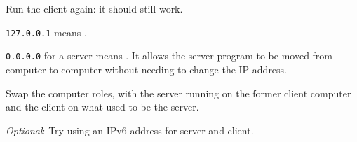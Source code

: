 Run the client again: it should still work.

\begin{IMPORTANT}
\texttt{127.0.0.1} means .

\texttt{0.0.0.0} for a server means . It allows
the server program to be moved from computer to computer without needing to change the
IP address.
\end{IMPORTANT}

\STEP Swap the computer roles, with the server running on the former client computer and
the client on what used to be the server.



\emph{Optional}: Try using an IPv6 address for server and client.


\COPYRIGHT


